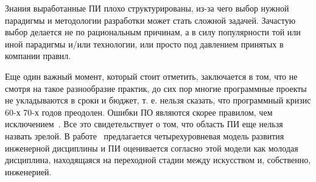 Знания выработанные ПИ плохо структурированы, из-за чего выбор нужной парадигмы и методологии разработки может стать сложной задачей. Зачастую выбор делается не по рациональным причинам, а в силу популярности той или иной парадигмы и/или технологии, или просто под давлением принятых в компании правил.

Еще один важный момент, который стоит отметить, заключается в том, что не смотря на такое разнообразие практик, до сих пор многие программные проекты не укладываются в сроки и бюджет, т. е. нельзя сказать, что программный кризис 60-х 70-х годов преодолен. Ошибки ПО являются скорее правилом, чем исключением~\cite{Jackson:2011:FSE}. Все это свидетельствует о том, что область ПИ еще нельзя назвать зрелой. В работе~\cite{Wang:2000:CSE} предлагается четырехуровневая модель развития инженерной дисциплины и ПИ оценивается согласно этой модели как молодая дисциплина, находящаяся на переходной стадии между искусством и, собственно, инженерией.
